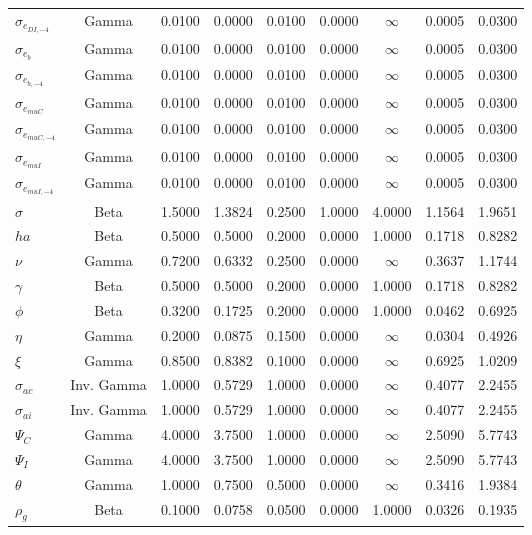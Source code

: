 \begin{center}
\begin{longtable}{lcccccccc}
$ \sigma_{{e_{DI,-4}}} $ & Gamma & 0.0100 & 0.0000 & 0.0100 & 0.0000 & $\infty$ & 0.0005 & 0.0300 \\ 
$ \sigma_{{e_b}} $ & Gamma & 0.0100 & 0.0000 & 0.0100 & 0.0000 & $\infty$ & 0.0005 & 0.0300 \\ 
$ \sigma_{{e_{b,-4}}} $ & Gamma & 0.0100 & 0.0000 & 0.0100 & 0.0000 & $\infty$ & 0.0005 & 0.0300 \\ 
$ \sigma_{{e_{muC}}} $ & Gamma & 0.0100 & 0.0000 & 0.0100 & 0.0000 & $\infty$ & 0.0005 & 0.0300 \\ 
$ \sigma_{{e_{muC,-4}}} $ & Gamma & 0.0100 & 0.0000 & 0.0100 & 0.0000 & $\infty$ & 0.0005 & 0.0300 \\ 
$ \sigma_{{e_{muI}}} $ & Gamma & 0.0100 & 0.0000 & 0.0100 & 0.0000 & $\infty$ & 0.0005 & 0.0300 \\ 
$ \sigma_{{e_{muI,-4}}} $ & Gamma & 0.0100 & 0.0000 & 0.0100 & 0.0000 & $\infty$ & 0.0005 & 0.0300 \\ 
$ {\sigma} $ & Beta & 1.5000 & 1.3824 & 0.2500 & 1.0000 & 4.0000 & 1.1564 & 1.9651 \\ 
$ {ha} $ & Beta & 0.5000 & 0.5000 & 0.2000 & 0.0000 & 1.0000 & 0.1718 & 0.8282 \\ 
$ \nu $ & Gamma & 0.7200 & 0.6332 & 0.2500 & 0.0000 & $\infty$ & 0.3637 & 1.1744 \\ 
$ \gamma $ & Beta & 0.5000 & 0.5000 & 0.2000 & 0.0000 & 1.0000 & 0.1718 & 0.8282 \\ 
$ {\phi} $ & Beta & 0.3200 & 0.1725 & 0.2000 & 0.0000 & 1.0000 & 0.0462 & 0.6925 \\ 
$ {\eta} $ & Gamma & 0.2000 & 0.0875 & 0.1500 & 0.0000 & $\infty$ & 0.0304 & 0.4926 \\ 
$ \xi $ & Gamma & 0.8500 & 0.8382 & 0.1000 & 0.0000 & $\infty$ & 0.6925 & 1.0209 \\ 
$ {\sigma_{ac}} $ & Inv. Gamma & 1.0000 & 0.5729 & 1.0000 & 0.0000 & $\infty$ & 0.4077 & 2.2455 \\ 
$ {\sigma_{ai}} $ & Inv. Gamma & 1.0000 & 0.5729 & 1.0000 & 0.0000 & $\infty$ & 0.4077 & 2.2455 \\ 
$ {\Psi_{C}} $ & Gamma & 4.0000 & 3.7500 & 1.0000 & 0.0000 & $\infty$ & 2.5090 & 5.7743 \\ 
$ {\Psi_I} $ & Gamma & 4.0000 & 3.7500 & 1.0000 & 0.0000 & $\infty$ & 2.5090 & 5.7743 \\ 
$ {\theta} $ & Gamma & 1.0000 & 0.7500 & 0.5000 & 0.0000 & $\infty$ & 0.3416 & 1.9384 \\ 
$ {\rho_g} $ & Beta & 0.1000 & 0.0758 & 0.0500 & 0.0000 & 1.0000 & 0.0326 & 0.1935 \\ 

\end{longtable}
\end{center}

